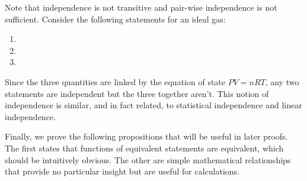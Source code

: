 \documentclass[11pt,letterpaper,fleqn]{memoir} %
\begin{document}
Note that independence is not transitive and pair-wise independence is not sufficient. Consider the following statements for an ideal gas:
\begin{enumerate}
	\item {}
	\item {}
	\item {}
\end{enumerate}
Since the three quantities are linked by the equation of state $PV=nRT$, any two statements are independent but the three together aren't. This notion of independence is similar, and in fact related, to statistical independence and linear independence.

Finally, we prove the following propositions that will be useful in later proofs. The first states that functions of equivalent statements are equivalent, which should be intuitively obvious. The other are simple mathematical relationships that provide no particular insight but are useful for calculations.
\end{document}
